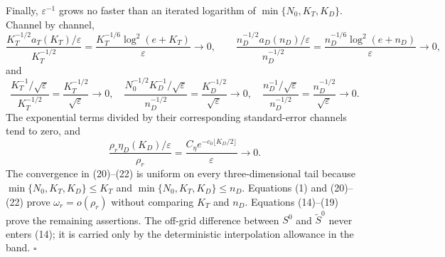 Finally, \(\varepsilon^{-1}\) grows no faster than an iterated logarithm of \(\min\{N_0,K_T,K_D\}\). Channel by channel,
\[
 \frac{K_T^{-1/2}a_T(K_T)/\varepsilon}{K_T^{-1/2}}
 =\frac{K_T^{-1/6}\log^2(e+K_T)}{\varepsilon}\to0,
 \qquad
 \frac{n_D^{-1/2}a_D(n_D)/\varepsilon}{n_D^{-1/2}}
 =\frac{n_D^{-1/6}\log^2(e+n_D)}{\varepsilon}\to0, \tag{20}
\]
and
\[
 \frac{K_T^{-1}/\sqrt\varepsilon}{K_T^{-1/2}}
 =\frac{K_T^{-1/2}}{\sqrt\varepsilon}\to0,
 \quad
 \frac{N_0^{-1/2}K_D^{-1}/\sqrt\varepsilon}{n_D^{-1/2}}
 =\frac{K_D^{-1/2}}{\sqrt\varepsilon}\to0,
 \quad
 \frac{n_D^{-1}/\sqrt\varepsilon}{n_D^{-1/2}}
 =\frac{n_D^{-1/2}}{\sqrt\varepsilon}\to0. \tag{21}
\]
The exponential terms divided by their corresponding standard-error channels tend to zero, and
\[
 \frac{\rho_r\eta_D(K_D)/\varepsilon}{\rho_r}
 =\frac{C_\eta e^{-c_0\lfloor K_D/2\rfloor}}{\varepsilon}\to0. \tag{22}
\]
The convergence in (20)--(22) is uniform on every three-dimensional tail because \(\min\{N_0,K_T,K_D\}\le K_T\) and \(\min\{N_0,K_T,K_D\}\le n_D\). Equations (1) and (20)--(22) prove \(\omega_r=o(\rho_r)\) without comparing \(K_T\) and \(n_D\). Equations (14)--(19) prove the remaining assertions. The off-grid difference between \(S^0\) and \(\widetilde S^0\) never enters (14); it is carried only by the deterministic interpolation allowance in the band. \(\square\)